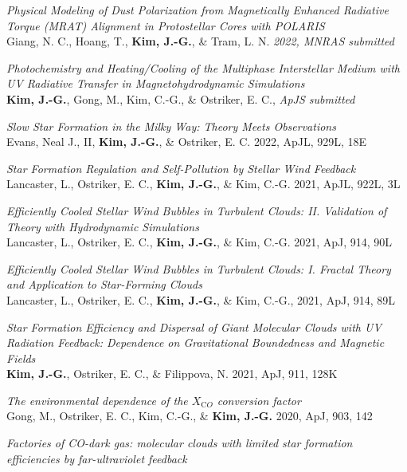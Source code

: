 \begin{benumerate}{18}
\item \textit{Physical Modeling of Dust Polarization from Magnetically
Enhanced Radiative Torque (MRAT) Alignment in Protostellar Cores with POLARIS}
\\ Giang, N. C., Hoang, T., \textbf{Kim, J.-G.}, \& Tram, L. N. \textit{2022,
MNRAS submitted}
\item \textit{Photochemistry and Heating/Cooling of the Multiphase Interstellar
Medium with UV Radiative Transfer in Magnetohydrodynamic Simulations} \\
\textbf{Kim, J.-G.}, Gong, M., Kim, C.-G., \& Ostriker, E. C., \textit{ApJS
submitted}
\item \textit{Slow Star Formation in the Milky Way: Theory Meets Observations}\\
  Evans, Neal J., II, \textbf{Kim, J.-G.}, \& Ostriker, E. C. 2022, ApJL, 929L,
  18E
\item \textit{Star Formation Regulation and Self-Pollution by Stellar Wind
    Feedback}\\
  Lancaster, L., Ostriker, E. C., \textbf{Kim, J.-G.}, \& Kim, C.-G. 2021, ApJL,
  922L, 3L
\item \textit{Efficiently Cooled Stellar Wind Bubbles in Turbulent Clouds:
    II. Validation of Theory with Hydrodynamic Simulations}\\
  Lancaster, L., Ostriker, E. C., \textbf{Kim, J.-G.}, \& Kim, C.-G. 2021, ApJ,
  914, 90L
\item \textit{Efficiently Cooled Stellar Wind Bubbles in Turbulent Clouds:
I. Fractal Theory and Application to Star-Forming Clouds}\\
  Lancaster, L., Ostriker, E. C., \textbf{Kim, J.-G.}, \& Kim, C.-G., 2021, ApJ,
914, 89L
\item \textit{Star Formation Efficiency and Dispersal of Giant Molecular
    Clouds with UV Radiation Feedback: Dependence on Gravitational Boundedness
    and Magnetic Fields} \\ \textbf{Kim, J.-G.}, Ostriker, E. C., \& Filippova,
  N. 2021, ApJ, 911, 128K
\item \textit{The environmental dependence of the $X_{\mathrm CO}$ conversion
    factor}\\ Gong, M., Ostriker, E. C., Kim, C.-G., \& \textbf{Kim,
    J.-G.} 2020, ApJ, 903, 142 
\item \textit{Factories of CO-dark gas: molecular clouds with limited star
formation efficiencies by far-ultraviolet feedback} \\

\end{benumerate}
